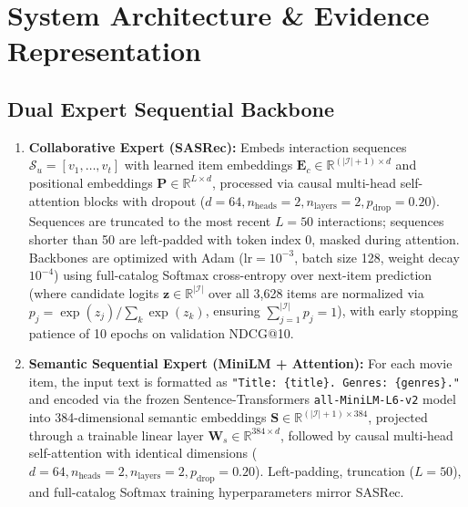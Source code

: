 
\section{System Architecture \& Evidence Representation}
\label{sec:methodology}

\subsection{Dual Expert Sequential Backbone}
\label{sec:backbone}

\begin{enumerate}[leftmargin=*]
    \item \textbf{Collaborative Expert (SASRec):} Embeds interaction sequences $\mathcal{S}_u = [v_1, \dots, v_t]$ with learned item embeddings $\mathbf{E}_c \in \mathbb{R}^{(|\mathcal{I}|+1) \times d}$ and positional embeddings $\mathbf{P} \in \mathbb{R}^{L \times d}$, processed via causal multi-head self-attention blocks with dropout ($d=64, n_{\text{heads}}=2, n_{\text{layers}}=2, p_{\text{drop}}=0.20$). Sequences are truncated to the most recent $L=50$ interactions; sequences shorter than 50 are left-padded with token index 0, masked during attention. Backbones are optimized with Adam ($\text{lr} = 10^{-3}$, batch size 128, weight decay $10^{-4}$) using full-catalog Softmax cross-entropy over next-item prediction (where candidate logits $\mathbf{z} \in \mathbb{R}^{|\mathcal{I}|}$ over all 3,628 items are normalized via $p_j = \exp(z_j)/\sum_k \exp(z_k)$, ensuring $\sum_{j=1}^{|\mathcal{I}|} p_j = 1$), with early stopping patience of 10 epochs on validation NDCG@10.
    \item \textbf{Semantic Sequential Expert (MiniLM + Attention):} For each movie item, the input text is formatted as \texttt{"Title: \{title\}. Genres: \{genres\}."} and encoded via the frozen Sentence-Transformers \texttt{all-MiniLM-L6-v2} model into 384-dimensional semantic embeddings $\mathbf{S} \in \mathbb{R}^{(|\mathcal{I}|+1) \times 384}$, projected through a trainable linear layer $\mathbf{W}_s \in \mathbb{R}^{384 \times d}$, followed by causal multi-head self-attention with identical dimensions ($d=64, n_{\text{heads}}=2, n_{\text{layers}}=2, p_{\text{drop}}=0.20$). Left-padding, truncation ($L=50$), and full-catalog Softmax training hyperparameters mirror SASRec.
\end{enumerate}

